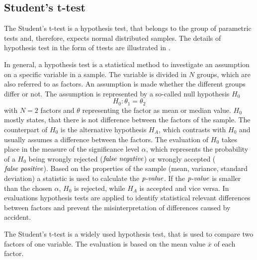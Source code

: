 \subsection{Student's t-test}\label{ord:ch2:sec4:subsec2}

The Student's t-test is a hypothesis test, that belongs to the group of parametric tests and, therefore, expects normal distributed samples.
The details of hypothesis test in the form of ttests are illustrated in \cite{Dodge08-Statistics} \cite{FisherBox81-StudentT} \cite{RK06-HypothesisTesting}.

In general, a hypothesis test is a statistical method to investigate an assumption on a specific variable in a sample.
The variable is divided in $N$ groups, which are also referred to as factors.
An assumption is made whether the different groups differ or not.
The assumption is represented by a so-called null hypothesis $H_{0}$
\begin{equation}
	H_{0}: \theta_{1} = \theta_{2}
\end{equation}
with $N=2$ factors and $\theta$ representing the factor as \eg mean or median value.
$H_{0}$ mostly states, that there is not difference between the factors of the sample.
The counterpart of $H_{0}$ is the alternative hypothesis $H_{A}$,
which contrasts with $H_{0}$ and usually assumes a difference between the factors.
The evaluation of $H_{0}$ takes place in the measure of the significance level $\alpha$, which represents the probability of a $H_{0}$ being wrongly rejected ($\textnormal{\textit{false negative}}$) or wrongly accepted ($\textnormal{\textit{false positive}}$).
Based on the properties of the sample (\eg mean, variance, standard deviation) a statistic is used to calculate the $\textnormal{\textit{p-value}}$.
If the $\textnormal{\textit{p-value}}$ is smaller than the chosen $\alpha$, $H_{0}$ is rejected, while $H_{A}$ is accepted and vice versa.
In evaluations hypothesis tests are applied to identify statistical relevant differences between factors and prevent the misinterpretation of differences caused by accident.

The Student's t-test is a widely used hypothesis test, that is used to compare two factors of one variable.
The evaluation is based on the mean value $\overline{x}$ of each factor.


